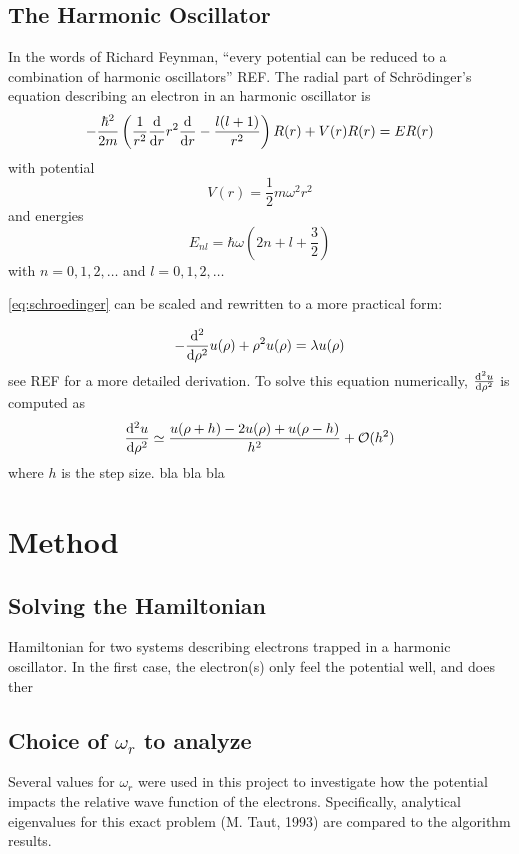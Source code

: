 \documentclass[aps,reprint]{revtex4-1}
\begin{document}
\subsection{The Harmonic Oscillator}
\label{sec:harmonic}
In the words of Richard Feynman, ``every potential can be reduced to a
combination of harmonic oscillators'' REF. The radial part of Schrödinger's
equation describing an electron in an harmonic oscillator is
\begin{equation}
  \label{eq:schroedinger}
  -\frac{\hbar^{2}}{2m} \left( \frac{1}{r^{2}}\dv{r}r^{2}\dv{r} - \frac{l(l+1)}{r^{2}} \right)R(r) + V(r)R(r) = ER(r)
\end{equation}
with potential
\begin{equation*}
  V(r) = \frac{1}{2}mω^{2}r^{2}
\end{equation*}
and energies
\begin{equation*}
  E_{nl} = \hbar\omega\left( 2n+l+\frac{3}{2} \right)
\end{equation*}
with \(n=0,1,2,\ldots\) and \(l = 0,1,2,\ldots\)

\eqref{eq:schroedinger} can be scaled and rewritten to a more practical form:

\begin{equation}
  \label{eq:scaledschroedinger}
  -\dv[2]{\rho}u(\rho)+\rho^{2}u(\rho) = \lambda u(\rho)
\end{equation}
see REF for a more detailed derivation. To solve this equation numerically,
\(\dv[2]{u}{\rho}\) is computed as
\begin{equation*}
  \dv[2]{u}{\rho} \simeq \frac{u(\rho+h)-2u(\rho)+u(\rho-h)}{h^{2}} + \mathcal{O}(h^{2})
\end{equation*}
where \(h\) is the step size.
bla bla bla
\section{Method}
\label{sec:method}

\subsection{Solving the Hamiltonian}
Hamiltonian for two systems
describing electrons trapped in a harmonic oscillator. In the first case, the
electron(s) only feel the potential well, and does ther
\subsection{Choice of $\omega_r$ to analyze}
Several values for $\omega_r$ were used in this project to investigate how the
potential impacts the relative wave function of the electrons. Specifically,
analytical eigenvalues for this exact problem (M. Taut, 1993) are compared
to the algorithm results.
\end{document}
